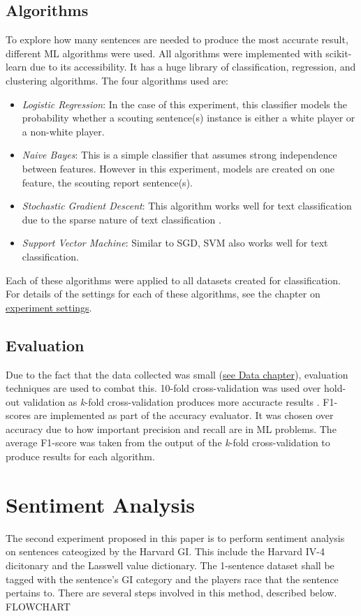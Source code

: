 \documentclass[oneside,12pt]{Classes/RoboticsLaTeX}
\begin{document}
\subsection{Algorithms}
To explore how many sentences are needed to produce the most accurate result, different ML algorithms were used. All algorithms were implemented with scikit-learn \citep{scikit-learn} 
due to its accessibility. It has a huge library of classification, regression, and clustering algorithms. The four algorithms used are:
\begin{itemize}
  \item {\it Logistic Regression}: In the case of this experiment, this classifier models the probability whether a scouting sentence(s) instance is either a white player or a non-white player.
  \item {\it Naive Bayes}: This is a simple classifier that assumes strong independence between features. However in this experiment, models are created on one feature, the scouting report sentence(s).
  \item {\it Stochastic Gradient Descent}: This algorithm works well for text classification due to the sparse nature of text classification \citep{SVM_SGD}.
  \item {\it Support Vector Machine}: Similar to SGD, SVM also works well for text classification.
\end{itemize}
Each of these algorithms were applied to all datasets created for classification. For details of the settings for each of these algorithms, see the chapter on \hyperref[chap:experiments]{experiment settings}.

\subsection{Evaluation}
Due to the fact that the data collected was small (\hyperref[chap:data]{see Data chapter}), evaluation techniques are used to combat this. 10-fold cross-validation was used over hold-out validation
as {\it k}-fold cross-validation produces more accuracte results \citep{k-fold_cross}. F1-scores are implemented as part of the accuracy evaluator. It was chosen over accuracy due to how important
precision and recall are in ML problems. The average F1-score was taken from the output of the {\it k}-fold cross-validation to produce results for each algorithm.

\section{Sentiment Analysis}
The second experiment proposed in this paper is to perform sentiment analysis on sentences cateogized by the Harvard GI. This include the Harvard IV-4 dicitonary and the Lasswell value dictionary.
The 1-sentence dataset shall be tagged with the sentence's GI category and the players race that the sentence pertains to. There are several steps involved in this method, described below.
FLOWCHART
\end{document}
